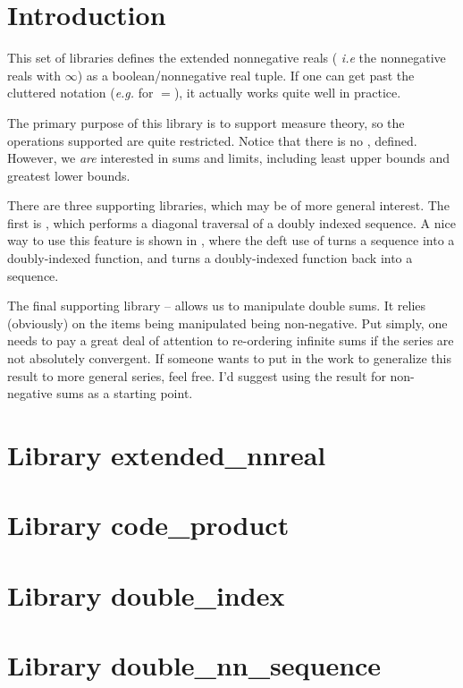 \documentclass{article}
\begin{document}
\section{Introduction}

This set of libraries defines the extended nonnegative reals ({\it
  i.e} the nonnegative reals with $\infty$) as a boolean/nonnegative
real tuple. If one can get past the cluttered notation ({\it e.g.}
 for $=$), it actually works quite well in practice.

The primary purpose of this library is to support measure theory, so
the operations supported are quite restricted. Notice that there is no
,  defined. However, we {\em are} interested
in sums and limits, including least upper bounds and greatest lower
bounds.

There are three supporting libraries, which may be of more general
interest. The first is , which performs a
diagonal traversal of a doubly indexed sequence. A nice way to use
this feature is shown in , where the deft use of
 turns a sequence into a doubly-indexed function,
and  turns a doubly-indexed function back into a
sequence.

The final supporting library --  allows us
to manipulate double sums. It relies (obviously) on the items being
manipulated being non-negative. Put simply, one needs to pay a great
deal of attention to re-ordering infinite sums if the series are not
absolutely convergent. If someone wants to put in the work to
generalize this result to more general series, feel free. I'd suggest
using the result for non-negative sums as a starting point.

\appendix
\newpage
\section{Library extended\_nnreal}

\newpage
\section{Library code\_product}

\newpage
\section{Library double\_index}

\newpage
\section{Library double\_nn\_sequence}

\end{document}
